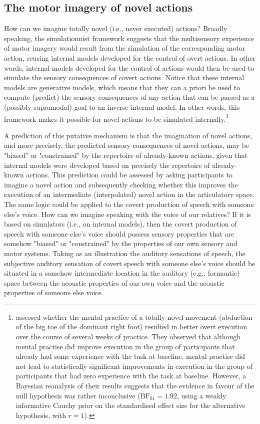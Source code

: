 \documentclass[utf8]{template/frontiersSCNS} %
\begin{document}
\subsection{The motor imagery of novel actions}

How can we imagine totally novel (i.e., never executed) actions? Broadly speaking, the simulationnist framework suggests that the multisensory experience of motor imagery would result from the simulation of the corresponding motor action, reusing internal models developed for the control of overt actions. In other words, internal models developed for the control of actions would then be used to simulate the sensory consequences of covert actions. Notice that these internal models are generative models, which means that they can a priori be used to compute (predict) the sensory consequences of any action that can be parsed as a (possibly supramodal) goal to an inverse internal model. In other words, this framework makes it possible for novel actions to be simulated internally.\footnote{\cite{mulder_role_2004} assessed whether the mental practice of a totally novel movement (abduction of the big toe of the dominant right foot) resulted in better overt execution over the course of several weeks of practice. They observed that although mental practise did improve execution in the group of participants that already had some experience with the task at baseline, mental practise did not lead to statistically significant improvements in execution in the group of participants that had zero experience with the task at baseline. However, a Bayesian reanalysis of their results suggests that the evidence in favour of the null hypothesis was rather inconclusive ($\text{BF}_{01} = 1.92$, using a weakly informative Cauchy prior on the standardised effect size for the alternative hypothesis, with $r = 1$).}

A prediction of this putative mechanism is that the imagination of novel actions, and more precisely, the predicted sensory consequences of novel actions, may be "biased" or "constrained" by the repertoire of already-known actions, given that internal models were developed based on precisely the repertoire of already-known actions. This prediction could be assessed by asking participants to imagine a novel action and subsequently checking whether this improves the execution of an intermediate (interpolated) novel action in the articulatory space. The same logic could be applied to the covert production of speech with someone else’s voice. How can we imagine speaking with the voice of our relatives? If it is based on simulators (i.e., on internal models), then the covert production of speech with someone else’s voice should possess sensory properties that are somehow "biased" or "constrained" by the properties of our own sensory and motor systems. Taking as an illustration the auditory sensations of speech, the subjective auditory sensation of covert speech with someone else’s voice should be situated in a somehow intermediate location in the auditory (e.g., formantic) space between the acoustic properties of our own voice and the acoustic properties of someone else voice.
\end{document}
